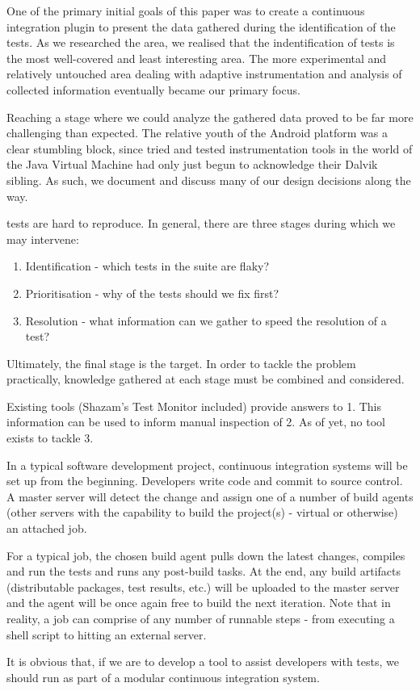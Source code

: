 One of the primary initial goals of this paper was to create a continuous integration plugin to present the data gathered during the identification of the \flaky{} tests. As we researched the area, we realised that the indentification of \flaky{} tests is the most well-covered and least interesting area. The more experimental and relatively untouched area dealing with adaptive instrumentation and analysis of collected information eventually became our primary focus.

Reaching a stage where we could analyze the gathered data proved to be far more challenging than expected. The relative youth of the Android platform was a clear stumbling block, since tried and tested instrumentation tools in the world of the Java Virtual Machine had only just begun to acknowledge their Dalvik sibling. As such, we document and discuss many of our design decisions along the way.

\flaky{} tests are hard to reproduce. In general, there are three stages during which we may intervene:
\begin{enumerate}
	\item Identification - which tests in the suite are flaky?
	\item Prioritisation - why of the \flaky{} tests should we fix first?
	\item Resolution - what information can we gather to speed the resolution of a test?
\end{enumerate}

Ultimately, the final stage is the target. In order to tackle the problem practically, knowledge gathered at each stage must be combined and considered.

Existing tools (Shazam’s \flaky{} Test Monitor included) provide answers to 1. This information can be used to inform manual inspection of 2. As of yet, no tool exists to tackle 3.

In a typical software development project, continuous integration systems will be set up from the beginning. Developers write code and commit to source control. A master server will detect the change and assign one of a number of build agents (other servers with the capability to build the project(s) - virtual or otherwise) an attached job.

For a typical job, the chosen build agent pulls down the latest changes, compiles and run the tests and runs any post-build tasks. At the end, any build artifacts (distributable packages, test results, etc.) will be uploaded to the master server and the agent will be once again free to build the next iteration. Note that in reality, a job can comprise of any number of runnable steps - from executing a shell script to hitting an external server.


It is obvious that, if we are to develop a tool to assist developers with \flaky{} tests, we should run as part of a modular continuous integration system.

